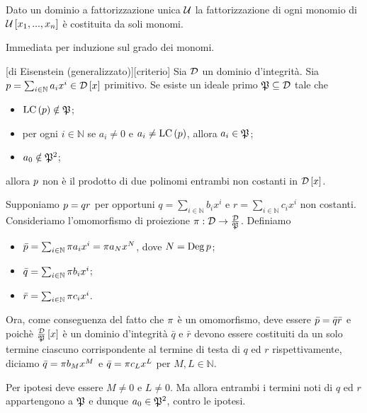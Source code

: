 \begin{Theorem}
	Dato un dominio a fattorizzazione unica $\mathcal{U}$ la fattorizzazione di ogni monomio di $\mathcal{U} \left [ x_1, ..., x_n \right ]$ \`e costituita da soli monomi.
\end{Theorem}
\Proof Immediata per induzione sul grado dei monomi. \EndProof
\begin{Theorem}
	[di Eisenstein (generalizzato)][criterio] Sia $\mathcal{D}$ un dominio d'integrit\`a. Sia $p = \sum_{i \in \mathbb{N}} a_ix^i \in \mathcal{D} \left [ x \right ]$ primitivo. Se esiste un ideale primo $\mathfrak{P} \subseteq \mathcal{D}$ tale che
	\begin{itemize}
		\item $\text{LC} \left ( p \right ) \notin \mathfrak{P}$;
		\item per ogni $i \in \mathbb{N}$ se $a_i \neq 0$ e $a_i \neq \text{LC} \left ( p \right )$, allora $a_i \in \mathfrak{P}$;
		\item $a_0 \notin \mathfrak{P}^2$;
	\end{itemize}
	allora $p$ non \`e il prodotto di due polinomi entrambi non costanti in $\mathcal{D} \left [ x \right ]$.
\end{Theorem}
\Proof Supponiamo $p = qr$ per opportuni $q = \sum_{i \in \mathbb{N}} b_ix^i$ e $r = \sum_{i \in \mathbb{N}} c_ix^i$ non costanti. Consideriamo l'omomorfismo di proiezione $\Projection: \IntegralDomain \rightarrow \Quotient{\IntegralDomain}{\PrimeIdeal}$. Definiamo
\begin{itemize}
	\item $\bar{\Polynomial} = \sum_{i \in \mathbb{N}} \Projection{a_i}x^i = \Projection{a_N} x^N$, dove $N = \operatorname{Deg}{p}$;
	\item $\bar{q} = \sum_{i \in \mathbb{N}} \Projection{b_i}x^i$;
	\item $\bar{r} = \sum_{i \in \mathbb{N}} \Projection{c_i}x^i$.
\end{itemize}
\par Ora, come conseguenza del fatto che $\Projection$ \`e un omomorfismo, deve essere $\bar{p} = \bar{q}\bar{r}$ e poich\`e $\frac{\mathcal{D}}{\mathfrak{P}} \left [ x \right ]$ \`e un dominio d'integrit\`a $\bar{q}$ e $\bar{r}$ devono essere costituiti da un solo termine ciascuno corrispondente al termine di testa di $q$ ed $r$ rispettivamente, diciamo $\bar{q} = \Projection{b_M}x^M$ e $\bar{q} = \Projection{c_L}x^L$ per $M, L \in \mathbb{N}$.
\par Per ipotesi deve essere $M \neq 0$ e $L \neq 0$. Ma allora entrambi i termini noti di $q$ ed $r$ appartengono a $\mathfrak{P}$ e dunque $a_0 \in \mathfrak{P}^2$, contro le ipotesi.

